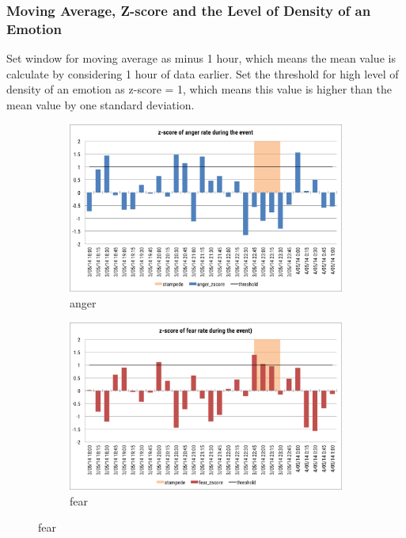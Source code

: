 \subsubsection{Moving Average, Z-score and the Level of Density of an Emotion}
Set window for moving average as minus 1 hour, which means the mean value is calculate by considering 1 hour of data earlier. Set the threshold for high level of density of an emotion as z-score = 1, which means this value is higher than the mean value by one standard deviation.
\begin{figure}[htb!] 
\centering   
\begin{subfigure}{0.5\textwidth}
\centering    
\includegraphics[width=0.99\linewidth]{AngerZscoreEvent}
\caption{anger}
\label{fig:angerZscoreEvent}
\end{subfigure}%
\begin{subfigure}{0.5\textwidth}
\centering    
\includegraphics[width=0.99\linewidth]{FearZscoreEvent}
\caption{fear}
\label{fig:fearZscoreEvent}
\end{subfigure}


\end{figure}
